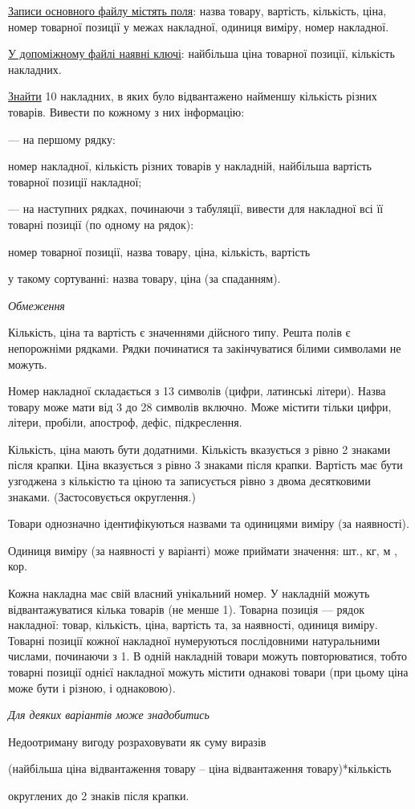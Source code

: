 \documentclass[11pt, ukrainian]{article}
\begin{document}
\underline{Записи основного файлу містять поля}: назва товару, вартість, кількість, ціна, номер товарної позиції у межах накладної, одиниця виміру, номер накладної.

\underline{У допоміжному файлі наявні ключі}: найбільша ціна товарної позиції, кількість накладних.

\underline{Знайти} 10 накладних, в яких було відвантажено найменшу кількість різних товарів. Вивести по кожному з них інформацію:\par
{\noindent}--- на першому рядку:\par
номер накладної, кількість різних товарів у накладній, найбільша вартість товарної позиції накладної;

{\noindent}--- на наступних рядках, починаючи з табуляції, вивести для накладної всі її товарні позиції (по одному на рядок):\par
номер товарної позиції, назва товару, ціна, кількість, вартість

{\noindent}у такому сортуванні: назва товару, ціна (за спаданням).


\bigskip\textit{Обмеження}

Кількість, ціна та вартість є значеннями дійсного типу.
Решта полів є непорожніми рядками.
Рядки починатися та закінчуватися білими символами не можуть.

Номер накладної складається з 13 символів (цифри, латинські літери).
Назва товару може мати від 3 до 28 символів включно.
Може містити тільки цифри, літери, пробіли, апостроф, дефіс, підкреслення.

Кількість, ціна мають бути додатними.
Кількість вказується з рівно 2 знаками після крапки.
Ціна вказується з рівно 3 знаками після крапки.
Вартість має бути узгоджена з кількістю та ціною та записується рівно з двома десятковими знаками.
(Застосовується округлення.)

Товари однозначно ідентифікуються назвами та одиницями виміру (за наявності).

Одиниця виміру (за наявності у варіанті) може приймати значення: шт., кг, м , кор.

Кожна накладна має свій власний унікальний номер.
У накладній можуть відвантажуватися кілька товарів (не менше 1).
Товарна позиція --- рядок накладної: товар, кількість, ціна, вартість та, за наявності, одиниця виміру.
Товарні позиції кожної накладної нумеруються послідовними натуральними числами, починаючи з 1.
В одній накладній товари можуть повторюватися, 
тобто товарні позиції однієї накладної можуть містити однакові товари 
(при цьому ціна може бути і різною, і однаковою).

\bigskip\textit{Для деяких варіантів може знадобитись}

Недоотриману вигоду розраховувати як суму виразів
{\center (найбільша ціна відвантаження товару – ціна відвантаження товару)*кількість\par}

\bigskip
{\noindent} округлених до 2 знаків після крапки.


\par
\newpage
\end{document}
